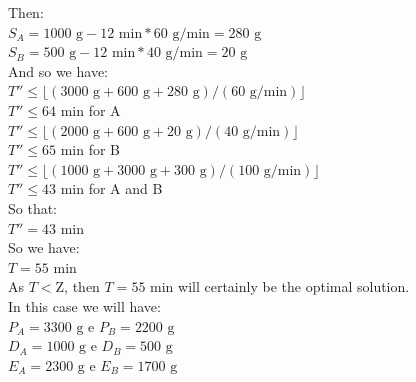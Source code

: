 \documentclass[authoryear,preprint,12pt]{elsarticle}
\begin{document}
Then:\\

$S_A = 1000 \textrm{ g} - 12 \textrm{ min} * 60 \textrm{ g}/\textrm{min} = 280 \textrm{ g}$ \\

$S_B = 500 \textrm{ g} - 12 \textrm{ min} * 40 \textrm{ g}/\textrm{min} = 20 \textrm{ g}$ \\

And so we have: \\

$T'' \leq \lfloor{(3000 \textrm{ g} + 600 \textrm{ g} + 280 \textrm{ g}) / (60 \textrm{ g}/\textrm{min})}\rfloor$ \\

$T'' \leq 64 \textrm{ min}$ \quad for A \\

$T'' \leq \lfloor{(2000 \textrm{ g} + 600 \textrm{ g} + 20 \textrm{ g}) / (40 \textrm{ g}/\textrm{min})}\rfloor$ \\

$T'' \leq 65 \textrm{ min}$ \quad for B \\

$T'' \leq \lfloor{(1000 \textrm{ g} + 3000 \textrm{ g} + 300 \textrm{ g}) / (100 \textrm{ g}/\textrm{min})}\rfloor$ \\

$T'' \leq 43 \textrm{ min}$ \quad for A and B \\

So that: \\

$T'' = 43 \textrm{ min}$ \\

So we have: \\

$T = 55 \textrm{ min}$ \\

As $T<\textrm{Z}$, then $T = 55 \textrm{ min}$ will certainly be the optimal solution. \\

In this case we will have: \\

$P_A = 3300 \textrm{ g}$ e $P_B=2200 \textrm{ g}$ \\

$D_A = 1000 \textrm{ g}$ e $D_B = 500 \textrm{ g}$ \\

$E_A = 2300 \textrm{ g}$ e $E_B = 1700 \textrm{ g}$ \\
\end{document}
